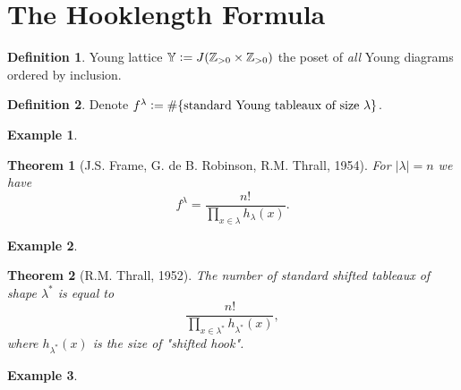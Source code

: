 \documentclass{report}
\newcommand{\Z}{\mathbb{Z}}
\newcommand{\defeq}{\vcentcolon=}
\newtheorem{theorem}{Theorem}[section]
\theoremstyle{definition}
\newtheorem{definition}{Definition}[section]
\newtheorem{example}{Example}[section]
\theoremstyle{remark}
\numberwithin{equation}{section}
\begin{document}
\section{The Hooklength Formula}
\begin{definition}
    Young lattice $\mathbb{Y} \defeq J(\Z_{> 0} \times \Z_{> 0})$ the poset of \emph{all} Young diagrams ordered by inclusion.
\end{definition}

\begin{definition}
    Denote $f^\lambda \defeq \#\{\text{standard Young tableaux of size } \lambda\}$.
\end{definition}

\begin{example}
    
\end{example}

\begin{theorem}[J.S. Frame, G. de B. Robinson, R.M. Thrall, 1954]
    For $|\lambda| = n$ we have \[
        f^\lambda = \frac{n!}{\prod_{x \in \lambda}h_\lambda(x)}.    
    \]
\end{theorem}

\begin{example}
    
\end{example}

\begin{theorem}[R.M. Thrall, 1952]
    The number of standard shifted tableaux of shape $\lambda^*$ is equal to \[
        \frac{n!}{\prod_{x \in \lambda^*} h_{\lambda^*}(x)}, 
    \] where $h_{\lambda^*}(x)$ is the size of "shifted hook".
\end{theorem}

\begin{example}
    
\end{example}
\end{document}
